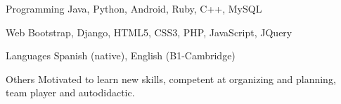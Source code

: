 

\begin{cvskills}

  \cvskill
    {Programming} %
    {Java, Python, Android, Ruby, C++, MySQL} %

  \cvskill
    {Web} %
    {Bootstrap, Django, HTML5, CSS3, PHP, JavaScript, JQuery} %

  \cvskill
    {Languages} %
    {Spanish (native), English (B1-Cambridge)} %

  \cvskill
    {Others} %
    {Motivated to learn new skills, competent at organizing and planning, team player and autodidactic.} %

\end{cvskills}

